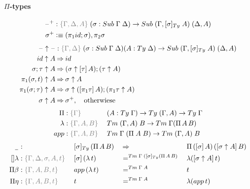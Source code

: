 \documentclass[a4paper,UKenglish,numberwithinsect,cleveref,thm-restate]{lipics-v2021}
\begin{document}
\paragraph*{$\Pi$-types}
\begin{alignat*}{5}
  \blank^+ & : \implicit{\Gamma, \Delta, A}\; (\sigma : \Sub\;\Gamma\;\Delta) \to \Sub\;(\Gamma, [\sigma]_{\Ty}\;A)\;(\Delta, A) \\
  \sigma^+ & \defeq (\pi_1\idS; \sigma), \pi_2\sigma
\end{alignat*}
\begin{alignat*}{5}
  \blank\uparrow\blank & : \implicit{\Gamma, \Delta}\;(\sigma : \Sub\;\Gamma\;\Delta) (A : \Ty\;\Delta) \to \Sub\;(\Gamma, [\sigma]_{\Ty}\;A)\;(\Delta, A) \\
\idS                \uparrow A  & \reduce \idS \\
\sigma ; \tau       \uparrow A  & \reduce (\sigma \uparrow \sub{\tau}{A} ) ; (\tau \uparrow A) \\
\pi_1(\sigma, t)    \uparrow A  & \reduce \sigma \uparrow A \\
\pi_1(\sigma; \tau) \uparrow A  & \reduce \sigma \uparrow (\sub{\pi_1 \tau}{A}) ; (\pi_1 \tau \uparrow A) \\
\sigma              \uparrow A  & \reduce \sigma^+,\quad  \text{otherwiese}
\end{alignat*}
\begin{alignat*}{5}
  \Pi             & : \implicit{\Gamma}\; && (A : \Ty\;\Gamma) \to \Ty\;(\Gamma, A) \to \Ty\;\Gamma \\
  \lambda         &: \implicit{\Gamma, A, B} \; && \Tm\;(\Gamma, A)\;B \to \Tm\;\Gamma(\Pi\,A\,B) \\
  \mathsf{app}    &: \implicit{\Gamma, A, B} \; && \Tm\;\Gamma\;(\Pi\;A\;B) \to \Tm\;(\Gamma, A)\;B
\end{alignat*}
\begin{alignat*}{5}
  \nameless       &: && [ \sigma ]_{\Ty}\, (\Pi\,A\,B) && {} \reduce {} && \Pi\,(\sub{\sigma}{A})\,(\sub{\sigma\uparrow A}{B}) \\
  []\lambda       & : \implicit{\Gamma, \Delta, \sigma, A, t}\;&& [ \sigma ] \,(\lambda\,t) && {} =^{\Tm\;\Gamma\;([\sigma]_{\Ty}(\Pi\,A\,B)} {} && \lambda ([\sigma \uparrow A ]\,t)\\
  \Pi\beta        & : \implicit{\Gamma, A, B, t}\; && \mathsf{app}\,(\lambda\,t)            && =^{\Tm\;\Gamma\;A} && t \\
  \Pi\eta         & : \implicit{\Gamma, A, B, t}\; && t                                     && =^{\Tm\;\Gamma\;A} && \lambda(\mathsf{app}\,t)
\end{alignat*}
\end{document}
